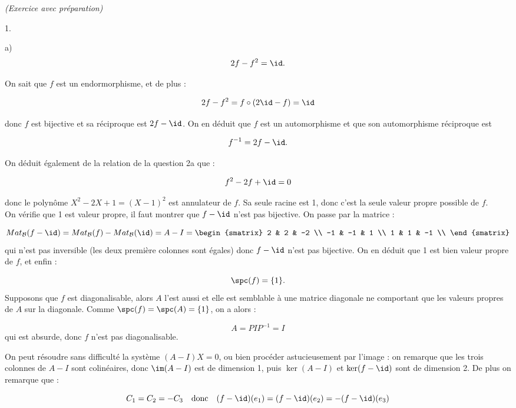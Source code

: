 \documentclass[11pt]{article}%
\begin{document}
\begin{exercice}{\it (Exercice avec préparation)}
\begin{noliste}{1.}
\begin{noliste}{a)}
\[
 2 f - f^{2} = \id.
\]
 
 \item On sait que $f$ est un endormorphisme, et de plus :
 
\[
 2 f - f^{2} = f \circ ( 2 \id - f ) = \id 
\]
 
 donc $f$ est bijective et sa réciproque est $2 f - \id$. On en
 déduit que $f$ est un automorphisme et que son automorphisme
 réciproque est
 
\[
 f^{-1} = 2 f - \id. 
\]
 
 \item On déduit également de la relation de la question 2a que :
 
\[
 f^{2} - 2 f + \id = 0 
\]
 
 donc le polynôme $X^{2} - 2 X + 1 = ( X - 1 )^{2} $ est annulateur
 de $f$. Sa seule racine est 1, donc c'est la seule valeur
 propre possible de $f$. \\
 On vérifie que 1 est valeur propre, il faut montrer que $f -
 \id$ n'est pas bijective. On passe par la matrice :
 
\[
 Mat_{ \mathcal{B} } ( f - \id ) = Mat_{ \mathcal{B} } (f) -
 Mat_{ \mathcal{B} } (\id ) = A - I = \begin{smatrix}
2 & 2 & -2
 \\
-1 & -1 & 1 \\
1 & 1 & -1 \\
\end{smatrix}
\]
 qui n'est pas inversible (les deux première colonnes sont
 égales) donc $f - \id$ n'est pas bijective. On en déduit que 1
 est bien valeur propre de $f$, et enfin :
 
\[
 \spc ( f ) = \{ 1 \}.
\]
 Supposons que $f$ est diagonalisable, alors $A$ l'est aussi et
 elle est semblable à une matrice diagonale ne comportant que
 les valeurs propres de $A$ sur la diagonale. Comme $\spc ( f )
 = \spc ( A ) = \{ 1 \}$, on a alors :
 
\[
 A = P I P^{-1} = I
\]
 qui est absurde, donc $f$ n'est pas diagonalisable. 

 \item On peut résoudre sans difficulté la système $(A - I ) X = 
 0$, ou bien procéder astucieusement par l'image : on remarque
 que les trois colonnes de $A - I$ sont colinéaires, donc $\im
 (A - I )$ est de dimension 1, puis $\ker ( A - I )$ et $\ker (
 f - \id )$ sont de dimension 2. De plus on remarque que :
 
\[
 C_{1} = C_{2} = - C_{3} \ \ \text{ donc } \ \ (f - \id) ( e_{1} ) = 
 (f-\id) (e_{2} ) = - (f-\id ) ( e_{3} )
\]
 

\end{noliste}
\end{noliste}
\end{exercice}
\end{document}
